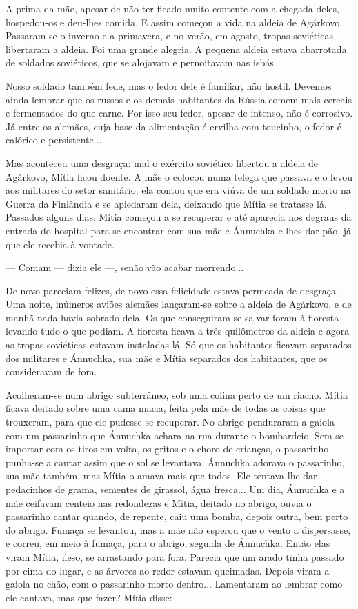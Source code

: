 A prima da mãe, apesar de não ter ficado muito contente com a chegada
deles, hospedou-os e deu-lhes comida. E assim começou a vida na aldeia
de Agárkovo. Passaram-se o inverno e a primavera, e no verão, em agosto,
tropas soviéticas libertaram a aldeia. Foi uma grande alegria. A pequena
aldeia estava abarrotada de soldados soviéticos, que se alojavam e
pernoitavam nas isbás.

Nosso soldado também fede, mas o fedor dele é familiar, não hostil.
Devemos ainda lembrar que os russos e os demais habitantes da Rússia
comem mais cereais e fermentados do que carne. Por isso seu fedor,
apesar de intenso, não é corrosivo. Já entre os alemães, cuja base da
alimentação é ervilha com toucinho, o fedor é calórico e persistente...

Mas aconteceu uma desgraça: mal o exército soviético libertou a aldeia
de Agárkovo, Mítia ficou doente. A mãe o colocou numa telega que passava
e o levou aos militares do setor sanitário; ela contou que era viúva de
um soldado morto na Guerra da Finlândia e se apiedaram dela, deixando
que Mítia se tratasse lá. Passados alguns dias, Mítia começou a se
recuperar e até aparecia nos degraus da entrada do hospital para se
encontrar com sua mãe e Ánnuchka e lhes dar pão, já que ele recebia à
vontade.

--- Comam --- dizia ele ---, senão vão acabar morrendo...

De novo pareciam felizes, de novo essa felicidade estava permeada de
desgraça. Uma noite, inúmeros aviões alemães lançaram-se sobre a aldeia
de Agárkovo, e de manhã nada havia sobrado dela. Os que conseguiram se
salvar foram à floresta levando tudo o que podiam. A floresta ficava a
três quilômetros da aldeia e agora as tropas soviéticas estavam
instaladas lá. Só que os habitantes ficavam separados dos militares e
Ánnuchka, sua mãe e Mítia separados dos habitantes, que os consideravam
de fora.

Acolheram-se num abrigo subterrâneo, sob uma colina perto de um riacho.
Mítia ficava deitado sobre uma cama macia, feita pela mãe de todas as
coisas que trouxeram, para que ele pudesse se recuperar. No abrigo
penduraram a gaiola com um passarinho que Ánnuchka achara na rua durante
o bombardeio. Sem se importar com os tiros em volta, os gritos e o choro
de crianças, o passarinho punha-se a cantar assim que o sol se
levantava. Ánnuchka adorava o passarinho, sua mãe também, mas Mítia o
amava mais que todos. Ele tentava lhe dar pedacinhos de grama, sementes
de girassol, água fresca... Um dia, Ánnuchka e a mãe ceifavam centeio
nas redondezas e Mítia, deitado no abrigo, ouvia o passarinho cantar
quando, de repente, caiu uma bomba, depois outra, bem perto do abrigo.
Fumaça se levantou, mas a mãe não esperou que o vento a dispersasse, e
correu, em meio à fumaça, para o abrigo, seguida de Ánnuchka. Então elas
viram Mítia, ileso, se arrastando para fora. Parecia que um arado tinha
passado por cima do lugar, e as árvores ao redor estavam queimadas.
Depois viram a gaiola no chão, com o passarinho morto dentro...
Lamentaram ao lembrar como ele cantava, mas que fazer? Mítia disse:

